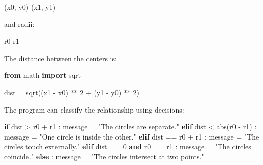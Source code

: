 \documentclass[
  11pt,
  a4paper,
]{article}
\newenvironment{Shaded}{}{}
\newcommand{\BuiltInTok}[1]{\textcolor[rgb]{0.00,0.50,0.00}{#1}}
\newcommand{\ControlFlowTok}[1]{\textcolor[rgb]{0.00,0.44,0.13}{\textbf{#1}}}
\newcommand{\DecValTok}[1]{\textcolor[rgb]{0.25,0.63,0.44}{#1}}
\newcommand{\ImportTok}[1]{\textcolor[rgb]{0.00,0.50,0.00}{\textbf{#1}}}
\newcommand{\KeywordTok}[1]{\textcolor[rgb]{0.00,0.44,0.13}{\textbf{#1}}}
\newcommand{\NormalTok}[1]{#1}
\newcommand{\OperatorTok}[1]{\textcolor[rgb]{0.40,0.40,0.40}{#1}}
\newcommand{\StringTok}[1]{\textcolor[rgb]{0.25,0.44,0.63}{#1}}
\begin{document}
\begin{Shaded}
\begin{Highlighting}[]
\NormalTok{(x0, y0)}
\NormalTok{(x1, y1)}
\end{Highlighting}
\end{Shaded}

and radii:

\begin{Shaded}
\begin{Highlighting}[]
\NormalTok{r0}
\NormalTok{r1}
\end{Highlighting}
\end{Shaded}

The distance between the centers is:

\begin{Shaded}
\begin{Highlighting}[]
\ImportTok{from}\NormalTok{ math }\ImportTok{import}\NormalTok{ sqrt}

\NormalTok{dist }\OperatorTok{=}\NormalTok{ sqrt((x1 }\OperatorTok{{-}}\NormalTok{ x0) }\OperatorTok{**} \DecValTok{2} \OperatorTok{+}\NormalTok{ (y1 }\OperatorTok{{-}}\NormalTok{ y0) }\OperatorTok{**} \DecValTok{2}\NormalTok{)}
\end{Highlighting}
\end{Shaded}

The program can classify the relationship using decisions:

\begin{Shaded}
\begin{Highlighting}[]
\ControlFlowTok{if}\NormalTok{ dist }\OperatorTok{\textgreater{}}\NormalTok{ r0 }\OperatorTok{+}\NormalTok{ r1 :}
\NormalTok{    message }\OperatorTok{=} \StringTok{"The circles are separate."}
\ControlFlowTok{elif}\NormalTok{ dist }\OperatorTok{\textless{}} \BuiltInTok{abs}\NormalTok{(r0 }\OperatorTok{{-}}\NormalTok{ r1) :}
\NormalTok{    message }\OperatorTok{=} \StringTok{"One circle is inside the other."}
\ControlFlowTok{elif}\NormalTok{ dist }\OperatorTok{==}\NormalTok{ r0 }\OperatorTok{+}\NormalTok{ r1 :}
\NormalTok{    message }\OperatorTok{=} \StringTok{"The circles touch externally."}
\ControlFlowTok{elif}\NormalTok{ dist }\OperatorTok{==} \DecValTok{0} \KeywordTok{and}\NormalTok{ r0 }\OperatorTok{==}\NormalTok{ r1 :}
\NormalTok{    message }\OperatorTok{=} \StringTok{"The circles coincide."}
\ControlFlowTok{else}\NormalTok{ :}
\NormalTok{    message }\OperatorTok{=} \StringTok{"The circles intersect at two points."}
\end{Highlighting}
\end{Shaded}
\end{document}
